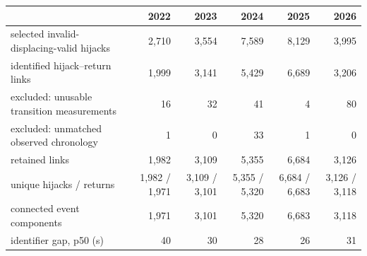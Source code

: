 \begin{tabular}{lrrrrr}
\toprule
 & 2022 & 2023 & 2024 & 2025 & 2026 \\
\midrule
selected invalid-displacing-valid hijacks & 2,710 & 3,554 & 7,589 & 8,129 & 3,995 \\
identified hijack--return links & 1,999 & 3,141 & 5,429 & 6,689 & 3,206 \\
excluded: unusable transition measurements & 16 & 32 & 41 & 4 & 80 \\
excluded: unmatched observed chronology & 1 & 0 & 33 & 1 & 0 \\
retained links & 1,982 & 3,109 & 5,355 & 6,684 & 3,126 \\
unique hijacks / returns & 1,982 / 1,971 & 3,109 / 3,101 & 5,355 / 5,320 & 6,684 / 6,683 & 3,126 / 3,118 \\
connected event components & 1,971 & 3,101 & 5,320 & 6,683 & 3,118 \\
identifier gap, p50 (s) & 40 & 30 & 28 & 26 & 31 \\
\bottomrule
\end{tabular}
